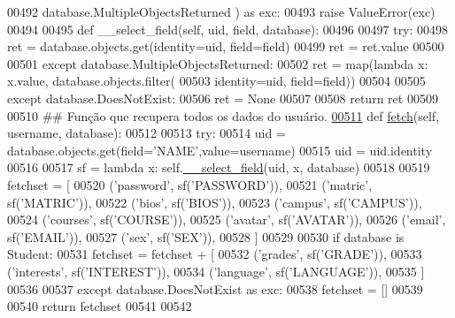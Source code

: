 \begin{DoxyCode}
00492                 database.MultipleObjectsReturned ) \textcolor{keyword}{as} exc:
00493             \textcolor{keywordflow}{raise} ValueError(exc)
00494 
00495     \textcolor{keyword}{def }\_\_select\_field(self, uid, field, database):
00496 
00497         \textcolor{keywordflow}{try}:
00498             ret = database.objects.get(identity=uid, field=field)
00499             ret = ret.value
00500 
00501         \textcolor{keywordflow}{except} database.MultipleObjectsReturned:
00502             ret = map(\textcolor{keyword}{lambda} x: x.value, database.objects.filter(
00503                     identity=uid, field=field))
00504 
00505         \textcolor{keywordflow}{except} database.DoesNotExist:
00506             ret = \textcolor{keywordtype}{None} 
00507 
00508         \textcolor{keywordflow}{return} ret
00509 
00510     \textcolor{comment}{##  Função que recupera todos os dados do usuário.}
\hypertarget{AdmUnit_8py_source_l00511}{}\hyperlink{classAdm_1_1AdmUnit_1_1PersAdm_a0813f79d2ef26ab014c21f4ae2217045}{00511}     \textcolor{keyword}{def }\hyperlink{classAdm_1_1AdmUnit_1_1PersAdm_a0813f79d2ef26ab014c21f4ae2217045}{fetch}(self, username, database):
00512 
00513         \textcolor{keywordflow}{try}:
00514             uid = database.objects.get(field=\textcolor{stringliteral}{'NAME'},value=username)
00515             uid = uid.identity
00516 
00517             sf = \textcolor{keyword}{lambda} x: self.\hyperlink{classAdm_1_1AdmUnit_1_1PersAdm_aa30c5e73f6bfa1c525007624caebaaa3}{\_\_select\_field}(uid, x, database)
00518 
00519             fetchset = [
00520                     (\textcolor{stringliteral}{'password'},    sf(\textcolor{stringliteral}{'PASSWORD'})),
00521                     (\textcolor{stringliteral}{'matric'},      sf(\textcolor{stringliteral}{'MATRIC'})),
00522                     (\textcolor{stringliteral}{'bios'},        sf(\textcolor{stringliteral}{'BIOS'})),
00523                     (\textcolor{stringliteral}{'campus'},      sf(\textcolor{stringliteral}{'CAMPUS'})),
00524                     (\textcolor{stringliteral}{'courses'},     sf(\textcolor{stringliteral}{'COURSE'})),
00525                     (\textcolor{stringliteral}{'avatar'},      sf(\textcolor{stringliteral}{'AVATAR'})),
00526                     (\textcolor{stringliteral}{'email'},       sf(\textcolor{stringliteral}{'EMAIL'})),
00527                     (\textcolor{stringliteral}{'sex'},         sf(\textcolor{stringliteral}{'SEX'})),
00528             ]
00529 
00530             \textcolor{keywordflow}{if} database \textcolor{keywordflow}{is} Student:
00531                 fetchset = fetchset + [     
00532                     (\textcolor{stringliteral}{'grades'},      sf(\textcolor{stringliteral}{'GRADE'})),
00533                     (\textcolor{stringliteral}{'interests'},   sf(\textcolor{stringliteral}{'INTEREST'})),
00534                     (\textcolor{stringliteral}{'language'},    sf(\textcolor{stringliteral}{'LANGUAGE'})),
00535                 ]
00536 
00537         \textcolor{keywordflow}{except} database.DoesNotExist \textcolor{keyword}{as} exc:
00538             fetchset = []
00539 
00540         \textcolor{keywordflow}{return} fetchset
00541 
00542 
\end{DoxyCode}
